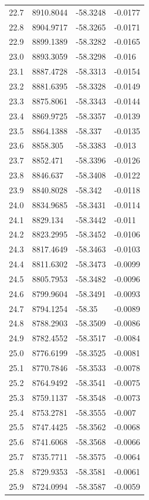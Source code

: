 \begin{table}[H]
\begin{tabular}{llll}
22.7 & 8910.8044 & -58.3248 & -0.0177 \\
22.8 & 8904.9717 & -58.3265 & -0.0171 \\
22.9 & 8899.1389 & -58.3282 & -0.0165 \\
23.0 & 8893.3059 & -58.3298 & -0.016 \\
23.1 & 8887.4728 & -58.3313 & -0.0154 \\
23.2 & 8881.6395 & -58.3328 & -0.0149 \\
23.3 & 8875.8061 & -58.3343 & -0.0144 \\
23.4 & 8869.9725 & -58.3357 & -0.0139 \\
23.5 & 8864.1388 & -58.337 & -0.0135 \\
23.6 & 8858.305 & -58.3383 & -0.013 \\
23.7 & 8852.471 & -58.3396 & -0.0126 \\
23.8 & 8846.637 & -58.3408 & -0.0122 \\
23.9 & 8840.8028 & -58.342 & -0.0118 \\
24.0 & 8834.9685 & -58.3431 & -0.0114 \\
24.1 & 8829.134 & -58.3442 & -0.011 \\
24.2 & 8823.2995 & -58.3452 & -0.0106 \\
24.3 & 8817.4649 & -58.3463 & -0.0103 \\
24.4 & 8811.6302 & -58.3473 & -0.0099 \\
24.5 & 8805.7953 & -58.3482 & -0.0096 \\
24.6 & 8799.9604 & -58.3491 & -0.0093 \\
24.7 & 8794.1254 & -58.35 & -0.0089 \\
24.8 & 8788.2903 & -58.3509 & -0.0086 \\
24.9 & 8782.4552 & -58.3517 & -0.0084 \\
25.0 & 8776.6199 & -58.3525 & -0.0081 \\
25.1 & 8770.7846 & -58.3533 & -0.0078 \\
25.2 & 8764.9492 & -58.3541 & -0.0075 \\
25.3 & 8759.1137 & -58.3548 & -0.0073 \\
25.4 & 8753.2781 & -58.3555 & -0.007 \\
25.5 & 8747.4425 & -58.3562 & -0.0068 \\
25.6 & 8741.6068 & -58.3568 & -0.0066 \\
25.7 & 8735.7711 & -58.3575 & -0.0064 \\
25.8 & 8729.9353 & -58.3581 & -0.0061 \\
25.9 & 8724.0994 & -58.3587 & -0.0059 \\

\end{tabular}
\end{table}
